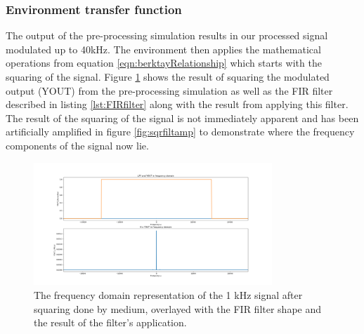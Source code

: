 \subsubsection{Environment transfer function}
The output of the pre-processing simulation results in our processed signal modulated up to 40kHz. The environment then applies the mathematical operations from equation \ref{eqn:berktayRelationship} which starts with the squaring of the signal. Figure \ref{fig:sqrfilt} shows the result of squaring the modulated output (YOUT)  from the pre-processing simulation as well as the FIR filter described in listing \ref{lst:FIRfilter} along with the result from applying this filter. The result of the squaring of the signal is not immediately apparent and has been artificially amplified in figure \ref{fig:sqrfiltamp} to demonstrate where the frequency components of the signal now lie.
\begin{figure}[ht!]
    \centering
    \includegraphics[width=0.8\textwidth]{Figures/SigSimulation/yRxsqr_LPFfft.png}
    \caption{The frequency domain representation of the 1 kHz signal after squaring done by medium, overlayed with the FIR filter shape and the result of the filter's application.}
    \label{fig:sqrfilt}
\end{figure}

